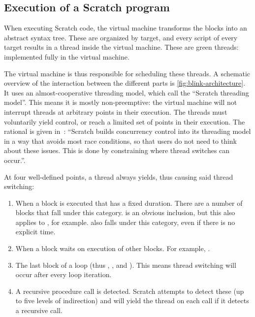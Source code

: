 \documentclass[../main]{subfiles}
\begin{document}
\subsection{Execution of a Scratch program}\label{subsec:execution-of-a-scratch-program}

When executing Scratch code, the virtual machine transforms the blocks into an abstract syntax tree.
These are organized by target, and every script of every target results in a thread inside the virtual machine.
These are green threads: implemented fully in the virtual machine.

The virtual machine is thus responsible for scheduling these threads.
A schematic overview of the interaction between the different parts is \cref{fig:blink-architecture}.
It uses an almost-cooperative threading model, which \textcite{maloneyScratchProgrammingLanguage2010} call the ``Scratch threading model''.
This means it is mostly non-preemptive: the virtual machine will not interrupt threads at arbitrary points in their execution.
The threads must voluntarily yield control, or reach a limited set of points in their execution.
The rational is given in~\cite{maloneyScratchProgrammingLanguage2010}: ``Scratch builds concurrency control into its threading model in a way that avoids most race conditions, so that users do not need to think about these issues.
This is done by constraining where thread switches can occur.''.

At four well-defined points, a thread always yields, thus causing said thread switching:
\begin{enumerate}
    \item When a block is executed that has a fixed duration.
        There are a number of blocks that fall under this category.
         is an obvious inclusion, but this also applies to , for example.
         also falls under this category, even if there is no explicit time.
    \item When a block waits on execution of other blocks.
        For example, .
    \item The last block of a loop (thus , , and ).
        This means thread switching will occur after every loop iteration.
    \item A recursive procedure call is detected.
        Scratch attempts to detect these (up to five levels of indirection) and will yield the thread on each call if it detects a recursive call.
\end{enumerate}
\end{document}
